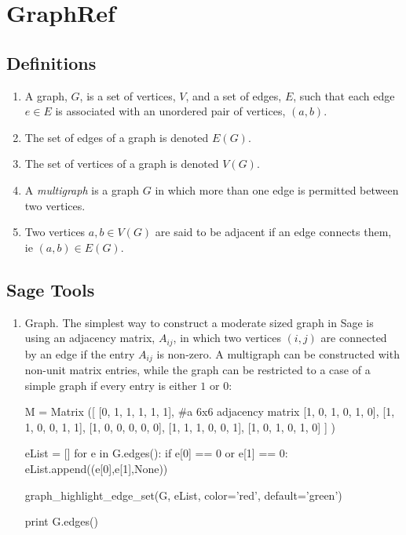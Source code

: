 \chapter{GraphRef}

\section{Definitions}

\begin{enumerate}

\item A graph, $G$, is a set of vertices, $V$, and a set of edges, $E$, such that each edge $e \in E$ is associated with an unordered pair of vertices, $(a,b)$.

\item The set of edges of a graph is denoted $E(G)$.

\item The set of vertices of a graph is denoted $V(G)$.

\item A \emph{multigraph} is a graph $G$ in which more than one edge is permitted between two vertices.

\item Two vertices $a, b \in V(G)$ are said to be adjacent if an edge connects them, ie $(a,b) \in E(G)$.

\end{enumerate}

\section{Sage Tools}
\begin{enumerate}

\item Graph.  The simplest way to construct a moderate sized graph in Sage is
using an adjacency matrix, $A_{ij}$, in which two vertices $(i,j)$ are
connected by an edge if the entry $A_{ij}$ is non-zero.  A multigraph can be
constructed with non-unit matrix entries, while the graph can be restricted to
a case of a simple graph if every entry is either $1$ or $0$:

\begin{sageverbatim}
M = Matrix ([ [0, 1, 1, 1, 1, 1],   #a 6x6 adjacency matrix
               [1, 0, 1, 0, 1, 0],
               [1, 1, 0, 0, 1, 1],
               [1, 0, 0, 0, 0, 0],
               [1, 1, 1, 0, 0, 1],
               [1, 0, 1, 0, 1, 0] ] )

eList = []
for e in G.edges():    
    if e[0] == 0 or e[1] == 0:
        eList.append((e[0],e[1],None))

graph_highlight_edge_set(G, eList, color='red', default='green')
        
print G.edges()
\end{sageverbatim}


\end{enumerate}
